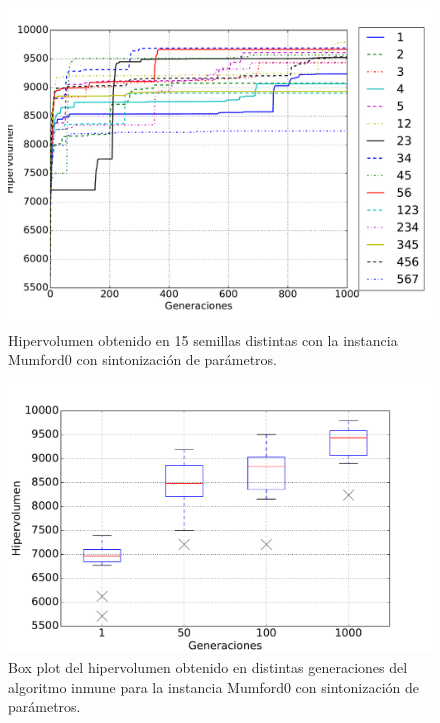 \begin{figure}[!htb]
\centering
\includegraphics[width=\textwidth]{img/hyp_Mumford0}
\caption{Hipervolumen obtenido en 15 semillas distintas con la instancia Mumford0 con sintonización de parámetros.}
\label{fig:hyp_mumford0}
\end{figure}

\begin{figure}[!htb]
\centering
\includegraphics[width=\textwidth]{img/hyp_Mumford0_bp}
\caption{Box plot del hipervolumen obtenido en distintas generaciones del algoritmo inmune para la instancia Mumford0 con sintonización de parámetros.}
\label{fig:hyp_mumford0_bp}
\end{figure}

